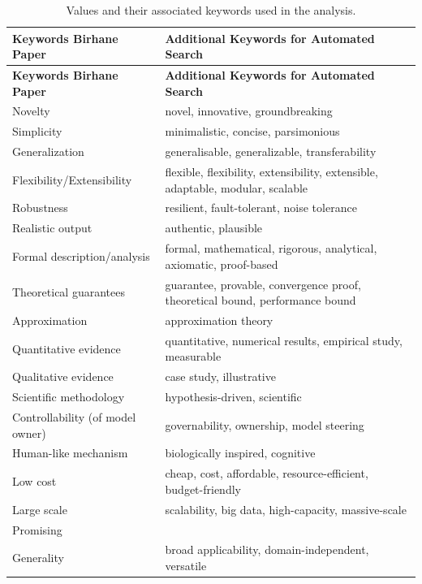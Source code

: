 \documentclass{article}
\begin{document}
\begin{longtable}{|p{5cm}|p{10cm}|} 
    \caption{Values and their associated keywords used in the analysis.} \\
    \hline
    \textbf{Keywords Birhane Paper} & \textbf{Additional Keywords for Automated Search} \\
    \hline
    \endfirsthead

    \hline
    \textbf{Keywords Birhane Paper} & \textbf{Additional Keywords for Automated Search} \\
    \hline
    \endhead
    
    Novelty & novel, innovative, groundbreaking \\ 
    Simplicity & minimalistic, concise, parsimonious \\ 
    Generalization & generalisable, generalizable, transferability \\ 
    Flexibility/Extensibility & flexible, flexibility, extensibility, extensible, adaptable, modular, scalable \\ 
    Robustness & resilient, fault-tolerant, noise tolerance \\ 
    Realistic output & authentic, plausible \\ 
    Formal description/analysis & formal, mathematical, rigorous, analytical, axiomatic, proof-based \\ 
    Theoretical guarantees & guarantee, provable, convergence proof, theoretical bound, performance bound \\ 
    Approximation & approximation theory \\ 
    Quantitative evidence & quantitative, numerical results, empirical study, measurable \\ 
    Qualitative evidence & case study, illustrative \\ 
    Scientific methodology & hypothesis-driven, scientific \\ 
    Controllability (of model owner) & governability, ownership, model steering \\ 
    Human-like mechanism & biologically inspired, cognitive \\ 
    Low cost & cheap, cost, affordable, resource-efficient, budget-friendly \\ 
    Large scale & scalability, big data, high-capacity, massive-scale \\ 
    Promising & \\ 
    Generality & broad applicability, domain-independent, versatile \\ 

\end{longtable}
\end{document}
